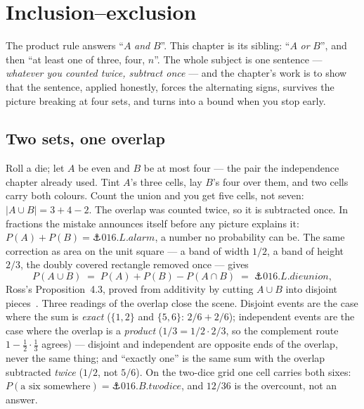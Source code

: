 \chapter{Inclusion–exclusion}

\begin{narrative}
The product rule answers ``$A$ \emph{and} $B$''. This chapter is its
sibling: ``$A$ \emph{or} $B$'', and then ``at least one of three, four,
$n$''. The whole subject is one sentence — \emph{whatever you counted
twice, subtract once} — and the chapter's work is to show that the
sentence, applied honestly, forces the alternating signs, survives the
picture breaking at four sets, and turns into a bound when you stop
early.

\section{Two sets, one overlap}

Roll a die; let $A$ be even and $B$ be at most four — the pair the
independence chapter already used. Tint $A$'s three cells, lay $B$'s
four over them, and two cells carry both colours. Count the union and
you get five cells, not seven: $|A \cup B| = 3 + 4 - 2$. The overlap
was counted twice, so it is subtracted once. In fractions the mistake
announces itself before any picture explains it: $P(A) + P(B) =
\anchor{016.L.alarm}$, a number no probability can be. The same
correction as area on the unit square — a band of width $1/2$, a band
of height $2/3$, the doubly covered rectangle removed once — gives
\[
  P(A \cup B) \;=\; P(A) + P(B) - P(A \cap B) \;=\; \anchor{016.L.dieunion} ,
\]
Ross's Proposition~4.3, proved from additivity by cutting $A \cup B$
into disjoint pieces~\cite{probability-sheldon-ross-a-first-course-in-probability-10th-ed-pearson-2}.
Three readings of the overlap close the scene. Disjoint events are the
case where the sum is \emph{exact} ($\{1,2\}$ and $\{5,6\}$: $2/6 +
2/6$); independent events are the case where the overlap is a
\emph{product} ($1/3 = 1/2 \cdot 2/3$, so the complement route $1 -
\tfrac12\cdot\tfrac13$ agrees) — disjoint and independent are opposite
ends of the overlap, never the same thing; and ``exactly one'' is the
same sum with the overlap subtracted \emph{twice} ($1/2$, not $5/6$).
On the two-dice grid one cell carries both sixes:
$P(\text{a six somewhere}) = \anchor{016.B.twodice}$, and $12/36$ is
the overcount, not an answer.


\end{narrative}
